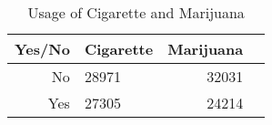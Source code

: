 \begin{table}[ht]
\centering
\begin{tabular}{rlrr}
  \hline
 Yes/No & Cigarette & Marijuana \\ 
  \hline
 No & 28971 & 32031 \\ 
  Yes & 27305 & 24214 \\ 
   \hline
\end{tabular}
\caption{Usage of Cigarette and Marijuana}
\end{table}
